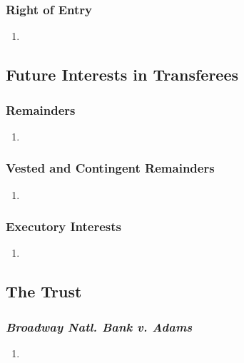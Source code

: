 \subsubsection{Right of Entry}

\begin{enumerate}
    \item %
\end{enumerate}

\subsection{Future Interests in Transferees}

\subsubsection{Remainders}

\begin{enumerate}
    \item %
\end{enumerate}

\subsubsection{Vested and Contingent Remainders}

\begin{enumerate}
    \item %
\end{enumerate}

\subsubsection{Executory Interests}

\begin{enumerate}
    \item %
\end{enumerate}

\subsection{The Trust}

\subsubsection{\emph{Broadway Natl. Bank v. Adams}}

\begin{enumerate}
    \item %
\end{enumerate}

